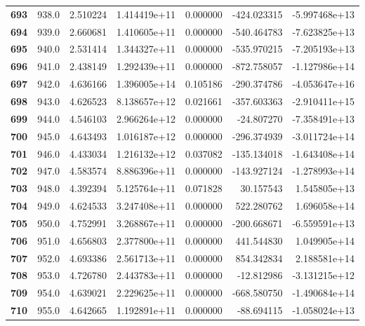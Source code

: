 \documentclass{report}[12pt]
\begin{document}
\begin{center}
\begin{tabular}{lrrrrrr}
\textbf{693 } &          938.0 &   2.510224 &  1.414419e+11 &    0.000000 &  -424.023315 & -5.997468e+13 \\
\textbf{694 } &          939.0 &   2.660681 &  1.410605e+11 &    0.000000 &  -540.464783 & -7.623825e+13 \\
\textbf{695 } &          940.0 &   2.531414 &  1.344327e+11 &    0.000000 &  -535.970215 & -7.205193e+13 \\
\textbf{696 } &          941.0 &   2.438149 &  1.292439e+11 &    0.000000 &  -872.758057 & -1.127986e+14 \\
\textbf{697 } &          942.0 &   4.636166 &  1.396005e+14 &    0.105186 &  -290.374786 & -4.053647e+16 \\
\textbf{698 } &          943.0 &   4.626523 &  8.138657e+12 &    0.021661 &  -357.603363 & -2.910411e+15 \\
\textbf{699 } &          944.0 &   4.546103 &  2.966264e+12 &    0.000000 &   -24.807270 & -7.358491e+13 \\
\textbf{700 } &          945.0 &   4.643493 &  1.016187e+12 &    0.000000 &  -296.374939 & -3.011724e+14 \\
\textbf{701 } &          946.0 &   4.433034 &  1.216132e+12 &    0.037082 &  -135.134018 & -1.643408e+14 \\
\textbf{702 } &          947.0 &   4.583574 &  8.886396e+11 &    0.000000 &  -143.927124 & -1.278993e+14 \\
\textbf{703 } &          948.0 &   4.392394 &  5.125764e+11 &    0.071828 &    30.157543 &  1.545805e+13 \\
\textbf{704 } &          949.0 &   4.624533 &  3.247408e+11 &    0.000000 &   522.280762 &  1.696058e+14 \\
\textbf{705 } &          950.0 &   4.752991 &  3.268867e+11 &    0.000000 &  -200.668671 & -6.559591e+13 \\
\textbf{706 } &          951.0 &   4.656803 &  2.377800e+11 &    0.000000 &   441.544830 &  1.049905e+14 \\
\textbf{707 } &          952.0 &   4.693386 &  2.561713e+11 &    0.000000 &   854.342834 &  2.188581e+14 \\
\textbf{708 } &          953.0 &   4.726780 &  2.443783e+11 &    0.000000 &   -12.812986 & -3.131215e+12 \\
\textbf{709 } &          954.0 &   4.639021 &  2.229625e+11 &    0.000000 &  -668.580750 & -1.490684e+14 \\
\textbf{710 } &          955.0 &   4.642665 &  1.192891e+11 &    0.000000 &   -88.694115 & -1.058024e+13 \\

\end{tabular}
\end{center}
\end{document}
